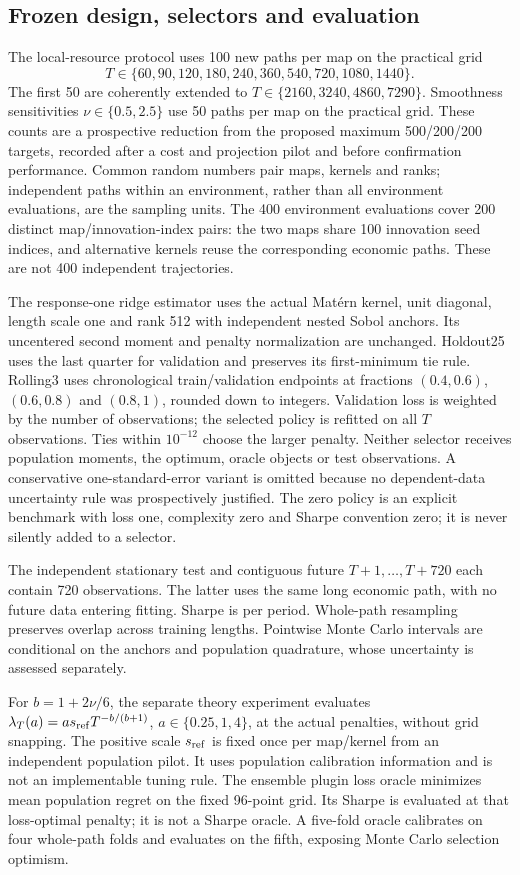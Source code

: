\subsection{Frozen design, selectors and evaluation}
The local-resource protocol uses 100 new paths per map on the practical grid
\[
T\in\{60,90,120,180,240,360,540,720,1080,1440\}.
\]
The first 50 are coherently
extended to $T\in\{2160,3240,4860,7290\}$. Smoothness sensitivities
$\nu\in\{0.5,2.5\}$ use 50 paths per map on the practical grid. These counts
are a prospective reduction from the proposed maximum 500/200/200 targets,
recorded after a cost and projection pilot and before confirmation performance.
Common random numbers pair maps, kernels and ranks; independent paths within
an environment, rather than all environment evaluations, are the sampling units.
The 400 environment evaluations cover 200 distinct map/innovation-index pairs:
the two maps share 100 innovation seed indices, and alternative kernels reuse
the corresponding economic paths. These are not 400 independent trajectories.

The response-one ridge estimator uses the actual Mat\'ern kernel, unit diagonal,
length scale one and rank 512 with independent nested Sobol anchors. Its
uncentered second moment and penalty normalization are unchanged. Holdout25
uses the last quarter for validation and preserves its first-minimum tie rule.
Rolling3 uses chronological train/validation endpoints at fractions
$(0.4,0.6)$, $(0.6,0.8)$ and $(0.8,1)$, rounded down to integers. Validation
loss is weighted by the number of observations; the selected policy is refitted
on all $T$ observations. Ties within $10^{-12}$ choose the larger penalty.
Neither selector receives population moments, the optimum, oracle objects or
test observations. A conservative one-standard-error variant is omitted
because no dependent-data uncertainty rule was prospectively justified.
The zero policy is an explicit benchmark with loss one, complexity zero and
Sharpe convention zero; it is never silently added to a selector.

The independent stationary test and contiguous future $T+1,\ldots,T+720$
each contain 720 observations. The latter uses the same long economic path,
with no future data entering fitting. Sharpe is per period. Whole-path
resampling preserves overlap across training lengths. Pointwise Monte Carlo
intervals are conditional on the anchors and population quadrature, whose
uncertainty is assessed separately.

For $b=1+2\nu/6$, the separate theory experiment evaluates
$\lambda_T(a)=a s_{\rm ref}T^{-b/(b+1)}$, $a\in\{0.25,1,4\}$, at the actual
penalties, without grid snapping. The positive scale $s_{\rm ref}$ is fixed
once per map/kernel from an independent population pilot. It uses population
calibration information and is not an implementable tuning rule.
The ensemble plugin loss oracle minimizes mean population regret on the fixed
96-point grid. Its Sharpe is evaluated at that loss-optimal penalty; it is not
a Sharpe oracle. A five-fold oracle calibrates on four whole-path folds and
evaluates on the fifth, exposing Monte Carlo selection optimism.

